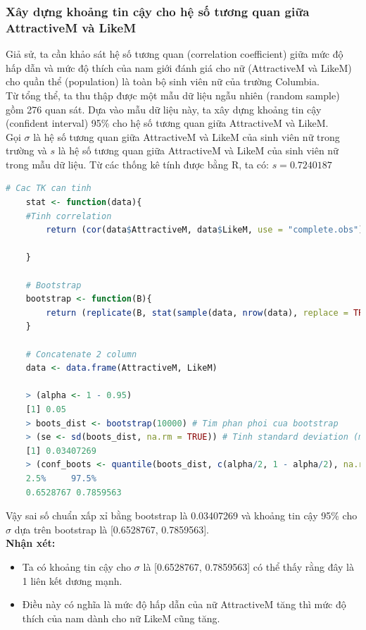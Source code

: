 \documentclass[a4paper,12pt]{article}
\begin{document}
	\subsubsection{Xây dựng khoảng tin cậy cho hệ số tương quan giữa AttractiveM và LikeM}
	Giả sử, ta cần khảo sát hệ số tương quan (correlation coefficient) giữa mức độ hấp dẫn và mức độ thích của nam giới đánh giá cho nữ (AttractiveM và LikeM) cho quần thể (population) là toàn bộ sinh viên nữ của trường Columbia.\\
	
	Từ tổng thể, ta thu thập được một mẫu dữ liệu ngẫu nhiên (random sample) gồm 276 quan sát. Dựa vào mẫu dữ liệu này, ta xây dựng khoảng tin cậy (confident interval) 95\% cho hệ số tương quan giữa AttractiveM và LikeM.\\
	
	Gọi $\sigma$ là hệ số tương quan giữa AttractiveM và LikeM của sinh viên nữ trong trường và $s$ là hệ số tương quan giữa AttractiveM và LikeM của sinh viên nữ trong mẫu dữ liệu. Từ các thống kê tính được bằng R, ta có: $s = 0.7240187$
	
	\begin{lstlisting}[language=R]
	# Cac TK can tinh
	stat <- function(data){
	#Tinh correlation
		return (cor(data$AttractiveM, data$LikeM, use = "complete.obs")) # Avoid missing values
	
	}
	
	# Bootstrap
	bootstrap <- function(B){
		return (replicate(B, stat(sample(data, nrow(data), replace = TRUE))))
	}
	
	# Concatenate 2 column
	data <- data.frame(AttractiveM, LikeM)
	
	> (alpha <- 1 - 0.95)
	[1] 0.05
	> boots_dist <- bootstrap(10000) # Tim phan phoi cua bootstrap
	> (se <- sd(boots_dist, na.rm = TRUE)) # Tinh standard deviation (missing value se bi bo qua)
	[1] 0.03407269
	> (conf_boots <- quantile(boots_dist, c(alpha/2, 1 - alpha/2), na.rm = TRUE)) # Tim khoang tin cay cho correlation
	2.5%     97.5% 
	0.6528767 0.7859563
	\end{lstlisting}
		Vậy sai số chuẩn xấp xỉ bằng bootstrap là 0.03407269 và khoảng tin cậy 95\% cho $\sigma$ dựa trên bootstrap là [0.6528767, 0.7859563].\\
		
	\textbf{Nhận xét:}
	\begin{itemize}
		\item Ta có khoảng tin cậy cho $\sigma$ là [0.6528767, 0.7859563] có thể thấy rằng đây là 1 liên kết dương mạnh. 
		\item Điều này có nghĩa là mức độ hấp dẫn của nữ AttractiveM tăng thì mức độ thích của nam dành cho nữ LikeM cũng tăng.
	\end{itemize}
	
\end{document}
